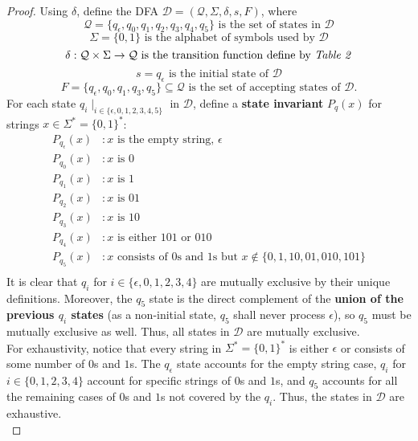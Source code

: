 \documentclass[12pt]{article}
\begin{document}
\begin{proof}
    Using $\delta$, define the DFA $\mathcal{D} = (\mathcal{Q}, \Sigma, \delta, s, F)$, where
    \[
        \mathcal{Q} = \{ q_{\epsilon}, q_0, q_1, q_2, q_3, q_4, q_5 \} \text{ is the set of states in } \mathcal{D}
    \]
    \[
        \Sigma = \{ 0, 1 \} \text{ is the alphabet of symbols used by } \mathcal{D}
    \]
    \[
        \delta : \mathcal{Q} \times \Sigma \to \mathcal{Q} \text{ is the transition function define by \textit{Table 2}}
    \]
    \[
        s = q_{\epsilon} \text{ is the initial state of } \mathcal{D} 
    \]
    \[
        F = \{ q_{\epsilon}, q_0, q_1, q_3, q_5 \} \subseteq \mathcal{Q} \text{ is the set of accepting states of } \mathcal{D} \text{.}
    \]
    For each state $q_i \mid_{i \in \{\epsilon, 0, 1, 2, 3, 4, 5\}}$ in $\mathcal{D}$, define a \textbf{state invariant} $P_q(x)$ for strings $x \in \Sigma^* = \{0, 1\}^*$:
    \begin{equation*}
            \begin{aligned}
                P_{q_\epsilon}(x)&: \text{$x$ is the empty string, } \epsilon \\
                P_{q_0}(x)&: \text{$x$ is $0$} \\
                P_{q_1}(x)&: \text{$x$ is $1$} \\
                P_{q_2}(x)&: \text{$x$ is $01$} \\
                P_{q_3}(x)&: \text{$x$ is $10$} \\
                P_{q_4}(x)&: \text{$x$ is either $101$ or $010$} \\
                P_{q_5}(x)&: \text{$x$ consists of $0$s and $1$s but $x \notin \{0, 1, 10, 01, 010, 101\}$} \\
            \end{aligned}
    \end{equation*}
    It is clear that $q_i$ for $i \in \{\epsilon, 0, 1, 2, 3, 4\}$ are mutually exclusive by their unique definitions. Moreover, the $q_5$ state is the direct complement of the \textbf{union of the previous $q_i$ states} (as a non-initial state, $q_5$ shall never process $\epsilon$), so $q_5$ must be mutually exclusive as well. Thus, all states in $\mathcal{D}$ are mutually exclusive. \\
    For exhaustivity, notice that every string in $\Sigma^* = \{0, 1\}^*$ is either $\epsilon$ or consists of some number of $0$s and $1$s. The $q_\epsilon$ state accounts for the empty string case, $q_i$ for $i \in \{0, 1, 2, 3, 4\}$ account for specific strings of $0$s and $1$s, and $q_5$ accounts for all the remaining cases of $0$s and $1$s not covered by the $q_i$. Thus, the states in $\mathcal{D}$ are exhaustive. \\

\end{proof}
\end{document}
